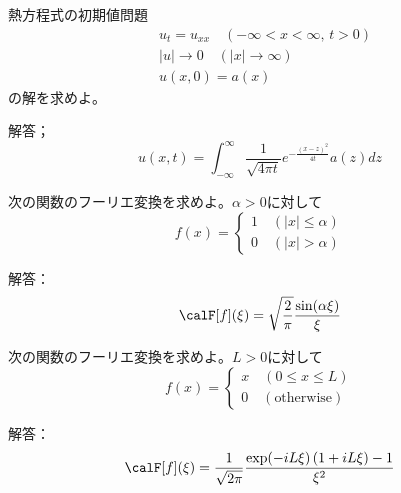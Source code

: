 \documentclass[report]{jlreq}
\begin{document}
\begin{problem}[全空間上の熱方程式]
    熱方程式の初期値問題
    \begin{equation}
        \begin{split}
            &u_t = u_{xx} \quad (-\infty < x < \infty,\, t > 0) \\
            &|u| \to 0 \quad (|x| \to \infty) \\
            &u(x, 0) = a(x)
        \end{split}
    \end{equation}
    の解を求めよ。

    解答；
    \begin{equation}
        u(x, t) = \int_{-\infty}^\infty \frac{1}{\sqrt{4\pi t}} e^{-\frac{(x-z)^2}{4t}} a(z) dz
    \end{equation}
\end{problem}

\begin{problem}
    次の関数のフーリエ変換を求めよ。$\alpha > 0$に対して
    \begin{equation}
        f(x) = \begin{cases}
            1 \quad (|x| \le \alpha) \\
            0 \quad (|x| > \alpha)
        \end{cases}
    \end{equation}

    解答：
    \begin{equation}
        \calF[f](\xi) = \sqrt{\frac{2}{\pi}} \frac{\sin(\alpha \xi)}{\xi}
    \end{equation}
\end{problem}

\begin{problem}
    次の関数のフーリエ変換を求めよ。$L > 0$に対して
    \begin{equation}
        f(x) = \begin{cases}
            x \quad (0 \le x \le L) \\
            0 \quad (\text{otherwise})
        \end{cases}
    \end{equation}

    解答：
    \begin{equation}
        \calF[f](\xi) = \frac{1}{\sqrt{2\pi}} \frac{\exp(-iL\xi)\, (1 + iL\xi) - 1}{\xi^2}
    \end{equation}
\end{problem}
\end{document}

